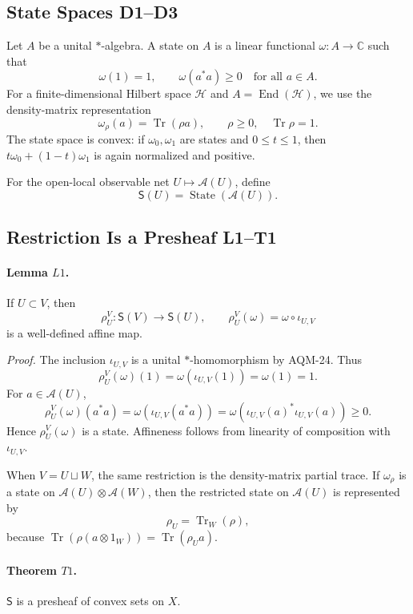 \subsection{State Spaces D1--D3}

Let \(A\) be a unital \(*\)-algebra.  A state on \(A\) is a linear functional
\(\omega:A\to\mathbb C\) such that
\[
  \omega(1)=1,\qquad \omega(a^*a)\geq0\quad\text{for all }a\in A.
\]
For a finite-dimensional Hilbert space \(\mathcal H\) and
\(A=\operatorname{End}(\mathcal H)\), we use the density-matrix
representation
\[
  \omega_\rho(a)=\operatorname{Tr}(\rho a),
  \qquad \rho\geq0,\quad \operatorname{Tr}\rho=1.
\]
The state space is convex: if \(\omega_0,\omega_1\) are states and
\(0\leq t\leq1\), then \(t\omega_0+(1-t)\omega_1\) is again normalized and
positive.

For the open-local observable net \(U\mapsto\mathcal A(U)\), define
\[
  \mathsf S(U)=\operatorname{State}(\mathcal A(U)).
\]

\subsection{Restriction Is a Presheaf L1--T1}

\paragraph{Lemma \(L1\).}
If \(U\subset V\), then
\[
  \rho^V_U:\mathsf S(V)\longrightarrow\mathsf S(U),
  \qquad
  \rho^V_U(\omega)=\omega\circ\iota_{U,V}
\]
is a well-defined affine map.

\emph{Proof.}
The inclusion \(\iota_{U,V}\) is a unital \(*\)-homomorphism by AQM-24.  Thus
\[
  \rho^V_U(\omega)(1)=\omega(\iota_{U,V}(1))=\omega(1)=1.
\]
For \(a\in\mathcal A(U)\),
\[
  \rho^V_U(\omega)(a^*a)
  =
  \omega(\iota_{U,V}(a^*a))
  =
  \omega(\iota_{U,V}(a)^*\iota_{U,V}(a))\geq0.
\]
Hence \(\rho^V_U(\omega)\) is a state.  Affineness follows from linearity of
composition with \(\iota_{U,V}\).

When \(V=U\sqcup W\), the same restriction is the density-matrix partial
trace.  If \(\omega_\rho\) is a state on
\(\mathcal A(U)\otimes\mathcal A(W)\), then the restricted state on
\(\mathcal A(U)\) is represented by
\[
  \rho_U=\operatorname{Tr}_W(\rho),
\]
because \(\operatorname{Tr}(\rho(a\otimes1_W))
=\operatorname{Tr}(\rho_Ua)\).

\paragraph{Theorem \(T1\).}
\(\mathsf S\) is a presheaf of convex sets on \(X\).

